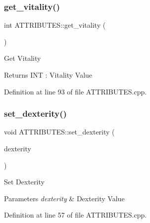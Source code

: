\mbox{\label{class_a_t_t_r_i_b_u_t_e_s_a0cfde0f6a98f751899ddc26324363ccc}} 
\subsubsection{\texorpdfstring{get\_vitality()}{get\_vitality()}}
{\footnotesize\ttfamily int A\+T\+T\+R\+I\+B\+U\+T\+E\+S\+::get\+\_\+vitality (\begin{DoxyParamCaption}{ }\end{DoxyParamCaption})}



Get Vitality 

\begin{DoxyReturn}{Returns}
I\+NT \+: Vitality Value
\end{DoxyReturn}


Definition at line 93 of file A\+T\+T\+R\+I\+B\+U\+T\+E\+S.\+cpp.

\mbox{\label{class_a_t_t_r_i_b_u_t_e_s_a2a08d7a27c465791aaae0e70cedafe65}} 
\subsubsection{\texorpdfstring{set\_dexterity()}{set\_dexterity()}}
{\footnotesize\ttfamily void A\+T\+T\+R\+I\+B\+U\+T\+E\+S\+::set\+\_\+dexterity (\begin{DoxyParamCaption}\item[{const int \&}]{dexterity }\end{DoxyParamCaption})}



Set Dexterity 


\begin{DoxyParams}{Parameters}
{\em dexterity} & Dexterity Value\\
\hline
\end{DoxyParams}


Definition at line 57 of file A\+T\+T\+R\+I\+B\+U\+T\+E\+S.\+cpp.

\mbox{\label{class_a_t_t_r_i_b_u_t_e_s_a946921884bd0225ae95a29e66934a9e4}} 
